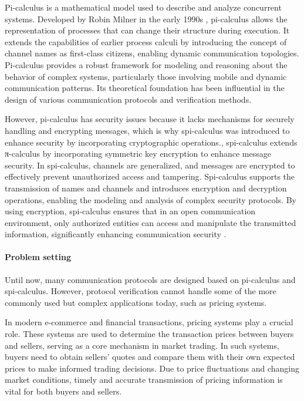 \documentclass[master,english]{kuisthesis}
\begin{document}
Pi-calculus is a mathematical model used to describe and analyze concurrent systems. Developed by Robin Milner in the early 1990s \cite{?}, pi-calculus allows the representation of processes that can change their structure during execution. It extends the capabilities of earlier process calculi by introducing the concept of channel names as first-class citizens, enabling dynamic communication topologies. Pi-calculus provides a robust framework for modeling and reasoning about the behavior of complex systems, particularly those involving mobile and dynamic communication patterns. Its theoretical foundation has been influential in the design of various communication protocols and verification methods.

However, pi-calculus has security issues because it lacks mechanisms for securely handling and encrypting messages, which is why spi-calculus was introduced to enhance security by incorporating cryptographic operations., spi-calculus extends π-calculus by incorporating symmetric key encryption to enhance message security\cite{?}. In spi-calculus, channels are generalized, and messages are encrypted to effectively prevent unauthorized access and tampering. Spi-calculus supports the transmission of names and channels and introduces encryption and decryption operations, enabling the modeling and analysis of complex security protocols. By using encryption, spi-calculus ensures that in an open communication environment, only authorized entities can access and manipulate the transmitted information, significantly enhancing communication security \cite{?}.

\paragraph{Problem setting}
Until now, many communication protocols are designed based on pi-calculus and spi-calculus. However, protocol verification cannot handle some of the more commonly used but complex applications today, such as pricing systems.


In modern e-commerce and financial transactions, pricing systems play a crucial role. These systems are used to determine the transaction prices between buyers and sellers, serving as a core mechanism in market trading. In such systems, buyers need to obtain sellers' quotes and compare them with their own expected prices to make informed trading decisions. Due to price fluctuations and changing market conditions, timely and accurate transmission of pricing information is vital for both buyers and sellers.
\end{document}
